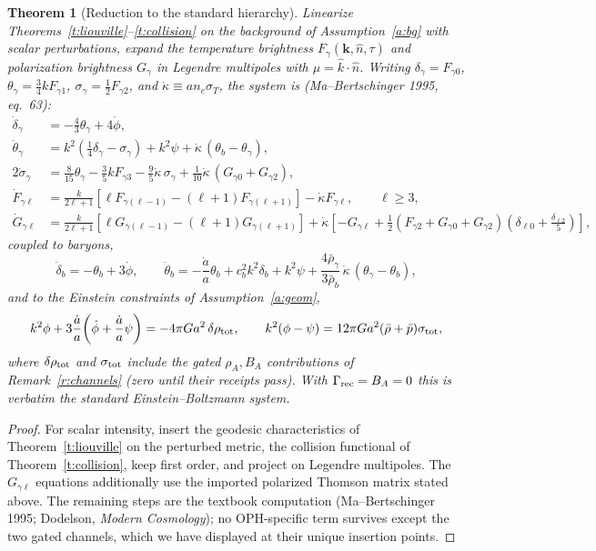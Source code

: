 \documentclass[11pt]{article}
\newtheorem{theorem}{Theorem}[section]
\theoremstyle{remark}
\newcommand{\ah}{\frac{\dot a}{a}}
\newcommand{\kdot}{\dot\kappa}
\begin{document}
\begin{theorem}[Reduction to the standard hierarchy]\label{t:hierarchy}
Linearize Theorems~\ref{t:liouville}--\ref{t:collision} on the background of
Assumption~\ref{a:bg} with scalar perturbations, expand the temperature
brightness $F_\gamma(\mathbf k,\hat n,\tau)$ and polarization brightness
$G_\gamma$ in Legendre multipoles with $\mu=\hat k\cdot\hat n$. Writing
$\delta_\gamma=F_{\gamma0}$, $\theta_\gamma=\tfrac34 kF_{\gamma1}$,
$\sigma_\gamma=\tfrac12F_{\gamma2}$, and $\kdot\equiv a n_e\sigma_T$, the
system is (Ma--Bertschinger 1995, eq.~63):
\begin{align*}
\dot\delta_\gamma &= -\tfrac43\theta_\gamma+4\dot\phi,\\
\dot\theta_\gamma &= k^2\!\left(\tfrac14\delta_\gamma-\sigma_\gamma\right)
+k^2\psi+\kdot\,(\theta_b-\theta_\gamma),\\
2\dot\sigma_\gamma &= \tfrac{8}{15}\theta_\gamma-\tfrac35 kF_{\gamma3}
-\tfrac95\kdot\,\sigma_\gamma
+\tfrac{1}{10}\kdot\,(G_{\gamma0}+G_{\gamma2}),\\
\dot F_{\gamma\ell} &= \frac{k}{2\ell+1}\left[\ell F_{\gamma(\ell-1)}
-(\ell+1)F_{\gamma(\ell+1)}\right]-\kdot F_{\gamma\ell},
\qquad \ell\ge3,\\
\dot G_{\gamma\ell} &= \frac{k}{2\ell+1}\left[\ell G_{\gamma(\ell-1)}
-(\ell+1)G_{\gamma(\ell+1)}\right]
+\kdot\left[-G_{\gamma\ell}
+\tfrac12\left(F_{\gamma2}+G_{\gamma0}+G_{\gamma2}\right)
\left(\delta_{\ell0}+\tfrac{\delta_{\ell2}}{5}\right)\right],
\end{align*}
coupled to baryons,
\[
\dot\delta_b=-\theta_b+3\dot\phi,\qquad
\dot\theta_b=-\ah\theta_b+c_b^2k^2\delta_b+k^2\psi
+\frac{4\bar\rho_\gamma}{3\bar\rho_b}\,\kdot\,(\theta_\gamma-\theta_b),
\]
and to the Einstein constraints of Assumption~\ref{a:geom},
\[
k^2\phi+3\ah\!\left(\dot\phi+\ah\psi\right)=-4\pi G a^2\,\delta\rho_{\rm tot},
\qquad
k^2(\phi-\psi)=12\pi G a^2(\bar\rho+\bar p)\sigma_{\rm tot},
\]
where $\delta\rho_{\rm tot}$ and $\sigma_{\rm tot}$ include the gated
$\rho_A,B_A$ contributions of Remark~\ref{r:channels} (zero until their
receipts pass). With $\Gamma_{\rm rec}=B_A=0$ this is verbatim the standard
Einstein--Boltzmann system.
\end{theorem}

\begin{proof}
For scalar intensity, insert the geodesic characteristics of
Theorem~\ref{t:liouville} on the perturbed metric, the collision functional
of Theorem~\ref{t:collision}, keep first order, and project on Legendre
multipoles.  The $G_{\gamma\ell}$ equations additionally use the imported
polarized Thomson matrix stated above.  The remaining steps are the textbook
computation (Ma--Bertschinger 1995; Dodelson, \emph{Modern Cosmology}); no
OPH-specific term survives except the two gated channels, which we have
displayed at their unique insertion points.
\end{proof}
\end{document}
